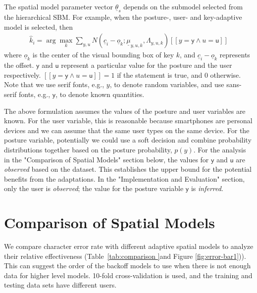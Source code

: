 \documentclass{sigchi}
\begin{document}
The spatial model parameter vector $\underline \theta_s$ depends on the submodel
selected from the hierarchical SBM. For example, when the posture-, user- and key-adaptive model is selected, then
\begin{align}          
\hat k_i = \arg\max_k \sum_{y, u} N(\underline c_i - \underline o_k; \underline\mu_{y,u,k}, \Lambda_{y,u,k})[[y = \textsf{y} \wedge u = \textsf{u}]]
\end{align}
where $\underline o_k$ is the center of the visual bounding box of key $k$, and $\underline c_i - \underline o_k$
represents the offset. $\textsf{y}$ and $\textsf{u}$ represent a particular value for the posture
and the user respectively. $[[y = \textsf{y} \wedge u = \textsf{u}]] = 1$ if the
statement is true, and $0$ otherwise. Note that we use serif fonts,
e.g., $y$, to denote random variables, and use sans-serif fonts, e.g.,
$\textsf{y}$, to denote known quantities.

The above formulation assumes the values of the posture and user variables are known.  For the user variable,
this is reasonable because smartphones are personal devices and we can assume that the
same user types on the same device. For the posture variable, potentially we could
use a soft decision and combine probability distributions together based on the posture probability, $p(y)$. For the analysis in the "Comparison of Spatial Models" section below, the values for $\textsf{y}$ and $\textsf{u}$ are
\textit{observed} based on the dataset. This establishes the upper bound for the potential benefits from the adaptations. In the "Implementation and Evaluation" section, only the user is \textit{observed}; the value for the posture variable $\textsf{y}$ is \textit{inferred}.

\section{Comparison of Spatial Models}
We compare character error rate with different adaptive spatial models to analyze their
relative effectiveness (Table~\ref{tab:comparison }and Figure
\ref{fig:error-bar1})). This can suggest the order of the
backoff models to use when there is not enough data for higher level models.
10-fold cross-validation is used, and the training and testing data sets have different users.
\end{document}
